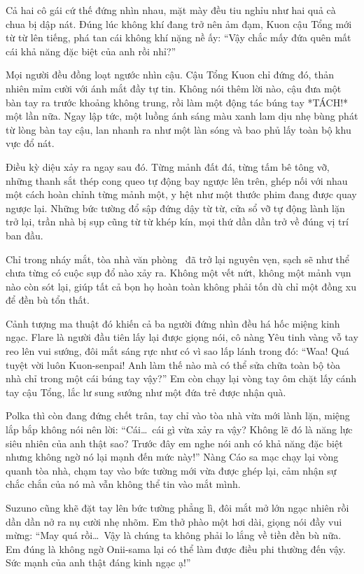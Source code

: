 \documentclass[../main.tex]{subfiles}
\begin{document}
Cả hai cô gái cứ thế đứng nhìn nhau, mặt mày đều tiu nghỉu như hai quả cà chua bị dập nát. Đúng lúc không khí đang trở nên ảm đạm, Kuon cậu Tổng mới từ từ lên tiếng, phá tan cái không khí nặng nề ấy: ``Vậy chắc mấy đứa quên mất cái khả năng đặc biệt của anh rồi nhỉ?''

Mọi người đều đồng loạt ngước nhìn cậu. Cậu Tổng Kuon chỉ đứng đó, thản nhiên mỉm cười với ánh mắt đầy tự tin. Không nói thêm lời nào, cậu đưa một bàn tay ra trước khoảng không trung, rồi làm một động tác búng tay *TÁCH!* một lần nữa. Ngay lập tức, một luồng ánh sáng màu xanh lam dịu nhẹ bùng phát từ lòng bàn tay cậu, lan nhanh ra như một làn sóng và bao phủ lấy toàn bộ khu vực đổ nát.

Điều kỳ diệu xảy ra ngay sau đó. Từng mảnh đất đá, từng tấm bê tông vỡ, những thanh sắt thép cong queo tự động bay ngược lên trên, ghép nối với nhau một cách hoàn chỉnh từng mảnh một, y hệt như một thước phim đang được quay ngược lại. Những bức tường đổ sập đứng dậy từ từ, cửa sổ vỡ tự động lành lặn trở lại, trần nhà bị sụp cũng từ từ khép kín, mọi thứ dần dần trở về đúng vị trí ban đầu.

Chỉ trong nháy mắt, tòa nhà văn phòng \hll\ đã trở lại nguyên vẹn, sạch sẽ như thể chưa từng có cuộc sụp đổ nào xảy ra. Không một vết nứt, không một mảnh vụn nào còn sót lại, giúp tất cả bọn họ hoàn toàn không phải tốn dù chỉ một đồng xu để đền bù tổn thất.

Cảnh tượng ma thuật đó khiến cả ba người đứng nhìn đều há hốc miệng kinh ngạc. Flare là người đầu tiên lấy lại được giọng nói, cô nàng Yêu tinh vàng vỗ tay reo lên vui sướng, đôi mắt sáng rực như có vì sao lấp lánh trong đó: ``Waa! Quá tuyệt vời luôn Kuon-senpai! Anh làm thế nào mà có thể sửa chữa toàn bộ tòa nhà chỉ trong một cái búng tay vậy?'' Em còn chạy lại vòng tay ôm chặt lấy cánh tay cậu Tổng, lắc lư sung sướng như một đứa trẻ được nhận quà.

Polka thì còn đang đứng chết trân, tay chỉ vào tòa nhà vừa mới lành lặn, miệng lắp bắp không nói nên lời: ``Cái\dots\ cái gì vừa xảy ra vậy? Không lẽ đó là năng lực siêu nhiên của anh thật sao? Trước đây em nghe nói anh có khả năng đặc biệt nhưng không ngờ nó lại mạnh đến mức này!'' Nàng Cáo sa mạc chạy lại vòng quanh tòa nhà, chạm tay vào bức tường mới vừa được ghép lại, cảm nhận sự chắc chắn của nó mà vẫn không thể tin vào mắt mình.

Suzuno cũng khẽ đặt tay lên bức tường phẳng lì, đôi mắt mở lớn ngạc nhiên rồi dần dần nở ra nụ cười nhẹ nhõm. Em thở phào một hơi dài, giọng nói đầy vui mừng: ``May quá rồi\dots\ Vậy là chúng ta không phải lo lắng về tiền đền bù nữa. Em đúng là không ngờ Onii-sama lại có thể làm được điều phi thường đến vậy. Sức mạnh của anh thật đáng kinh ngạc ạ!''
\end{document}
